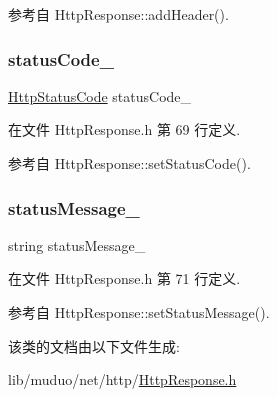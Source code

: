 参考自 Http\+Response\+::add\+Header().

\mbox{\label{classmuduo_1_1net_1_1HttpResponse_a24a07a498fb950d72850091c0306c939}} 
\subsubsection{\texorpdfstring{status\+Code\+\_\+}{statusCode\_}}
{\footnotesize\ttfamily \hyperlink{classmuduo_1_1net_1_1HttpResponse_ab80f66127508dfced7a0fe1929fe12cc}{Http\+Status\+Code} status\+Code\+\_\+\hspace{0.3cm}{\ttfamily [private]}}



在文件 Http\+Response.\+h 第 69 行定义.



参考自 Http\+Response\+::set\+Status\+Code().

\mbox{\label{classmuduo_1_1net_1_1HttpResponse_a2f9afda0b0e65abfe8f2525de3db81b1}} 
\subsubsection{\texorpdfstring{status\+Message\+\_\+}{statusMessage\_}}
{\footnotesize\ttfamily string status\+Message\+\_\+\hspace{0.3cm}{\ttfamily [private]}}



在文件 Http\+Response.\+h 第 71 行定义.



参考自 Http\+Response\+::set\+Status\+Message().



该类的文档由以下文件生成\+:\begin{DoxyCompactItemize}
\item 
lib/muduo/net/http/\hyperlink{HttpResponse_8h}{Http\+Response.\+h}\end{DoxyCompactItemize}
